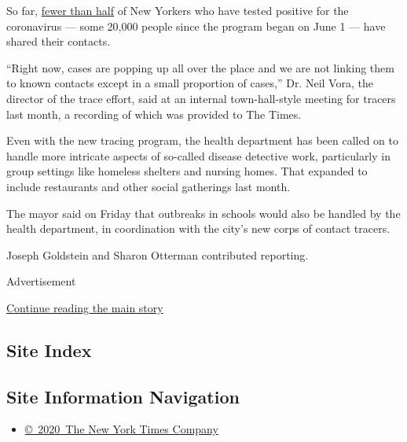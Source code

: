 So far,
\href{https://hhinternet.blob.core.windows.net/uploads/2020/07/test-and-trace-data-metrics-20200727.pdf}{fewer
than half} of New Yorkers who have tested positive for the coronavirus
--- some 20,000 people since the program began on June 1 --- have shared
their contacts.

``Right now, cases are popping up all over the place and we are not
linking them to known contacts except in a small proportion of cases,''
Dr. Neil Vora, the director of the trace effort, said at an internal
town-hall-style meeting for tracers last month, a recording of which was
provided to The Times.

Even with the new tracing program, the health department has been called
on to handle more intricate aspects of so-called disease detective work,
particularly in group settings like homeless shelters and nursing homes.
That expanded to include restaurants and other social gatherings last
month.

The mayor said on Friday that outbreaks in schools would also be handled
by the health department, in coordination with the city's new corps of
contact tracers.

Joseph Goldstein and Sharon Otterman contributed reporting.

Advertisement

\protect\hyperlink{after-bottom}{Continue reading the main story}

\hypertarget{site-index}{%
\subsection{Site Index}\label{site-index}}

\hypertarget{site-information-navigation}{%
\subsection{Site Information
Navigation}\label{site-information-navigation}}

\begin{itemize}
\tightlist
\item
  \href{https://help.nytimes3xbfgragh.onion/hc/en-us/articles/115014792127-Copyright-notice}{©~2020~The
  New York Times Company}
\end{itemize}

